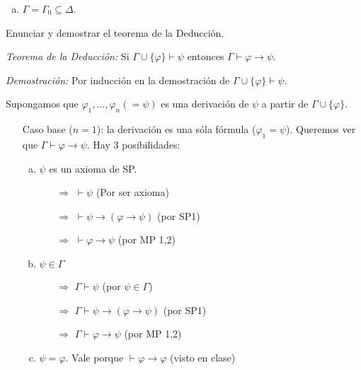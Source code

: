 \begin{questions}
\begin{solution}
\begin{enumerate}[(a)]
 \item $\Gamma = \Gamma_0 \subseteq \Delta$.
\end{enumerate}

\end{solution}

\question Enunciar y demostrar el teorema de la Deducci\'on. 


\begin{solution}

 {\it Teorema de la Deducci\'on: } Si $\Gamma\cup\{\varphi\}\vdash\psi$ entonces $\Gamma \vdash \varphi\rightarrow\psi$.
  
 {\it Demostraci\'on: } Por inducci\'on en la demostraci\'on de $\Gamma\cup\{\varphi\}\vdash\psi$.
 
 Supongamos que $\varphi_1, \dots, \varphi_n(=\psi)$ es una derivaci\'on de $\psi$ a partir de $\Gamma\cup\{\varphi\}$.
 
 \begin{itemize}[\quad]
  \item[Caso base ($n=1$):] la derivaci\'on es una s\'ola f\'ormula ($\varphi_1=\psi$). Queremos ver que $\Gamma\vdash\varphi\rightarrow\psi$. Hay 3 posibilidades: 
  \begin{enumerate}[a)]
   \item $\psi$ es un axioma de SP. 
    \begin{enumerate}
      \item[$\Rightarrow$] $\vdash\psi$ \hfill (Por ser axioma) 
      \item[$\Rightarrow$] $\vdash\psi\rightarrow(\varphi\rightarrow\psi)$ \hfill (por SP1)
      \item[$\Rightarrow$] $\vdash\varphi\rightarrow\psi$ \hfill (por MP 1,2) 
    \end{enumerate}
    
   \item $\psi\in\Gamma$
   \begin{enumerate}
      \item[$\Rightarrow$] $\Gamma\vdash\psi$ \hfill (por $\psi\in\Gamma$)
      \item[$\Rightarrow$] $\Gamma\vdash\psi\rightarrow(\varphi\rightarrow\psi)$ \hfill (por SP1)
      \item[$\Rightarrow$] $\Gamma\vdash\varphi\rightarrow\psi$ \hfill (por MP 1,2)
    \end{enumerate}
    
   \item $\psi=\varphi$. 
    Vale porque $\vdash\varphi\rightarrow\varphi$ (visto en clase)
  \end{enumerate}


\end{itemize}
\end{solution}
\end{questions}
